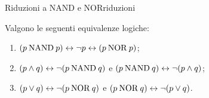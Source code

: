\begin{concetto}
\begin{Proposizione}{Riduzioni a NAND e NOR}{riduzioni}
    \begin{prerequisiti}
    \end{prerequisiti}
    Valgono le seguenti equivalenze logiche:
    \begin{enumerate}
        \item $(p \mathbin{\mathrm{NAND}} p) \leftrightarrow \neg p \leftrightarrow (p \mathbin{\mathrm{NOR}} p)$;
        \item $(p \wedge q) \leftrightarrow \neg(p \mathbin{\mathrm{NAND}} q)$ \quad e \quad $(p \mathbin{\mathrm{NAND}} q) \leftrightarrow \neg(p \wedge q)$;
        \item $(p \vee q) \leftrightarrow \neg(p \mathbin{\mathrm{NOR}} q)$ \quad e \quad $(p \mathbin{\mathrm{NOR}} q) \leftrightarrow \neg(p \vee q)$.
    \end{enumerate}
\end{Proposizione}


\end{concetto}
